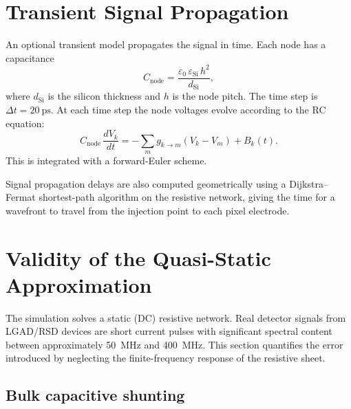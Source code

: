 \documentclass[preprint,numbers,1p]{elsarticle}
\begin{document}
\section{Transient Signal Propagation}
\label{sec:transient}

An optional transient model propagates the signal in time. Each node has a capacitance
\begin{equation}
  C_\mathrm{node} = \frac{\varepsilon_0\,\varepsilon_\mathrm{Si}\,h^2}{d_\mathrm{Si}},
\end{equation}
where $d_\mathrm{Si}$ is the silicon thickness and $h$ is the node pitch. The time step is
$\Delta t = \SI{20}{\pico\second}$. At each time step the node voltages evolve according to the
RC equation:
\begin{equation}
  C_\mathrm{node}\,\frac{dV_k}{dt} = -\sum_m g_{k\to m}(V_k - V_m) + B_k(t).
\end{equation}
This is integrated with a forward-Euler scheme.

Signal propagation delays are also computed geometrically using a Dijkstra--Fermat
shortest-path algorithm on the resistive network, giving the time for a wavefront to travel
from the injection point to each pixel electrode.

\section{Validity of the Quasi-Static Approximation}
\label{sec:quasistatic}

The simulation solves a static (DC) resistive network. Real detector signals from
LGAD/RSD devices are short current pulses with significant spectral content between
approximately \SI{50}{MHz} and \SI{400}{MHz}. This section quantifies the error
introduced by neglecting the finite-frequency response of the resistive sheet.

\subsection{Bulk capacitive shunting}
\label{sec:bulk_cap}
\end{document}
